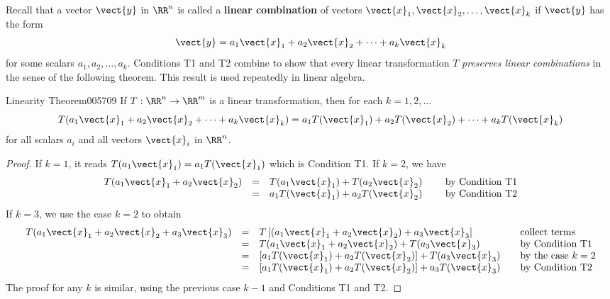 Recall that a vector $\vect{y}$ in $\RR^n$ is called a \textbf{linear combination} of vectors $\vect{x}_{1}, \vect{x}_{2}, \dots, \vect{x}_{k}$ if $\vect{y}$ has the form
\begin{equation*}
\vect{y} = a_{1}\vect{x}_{1} + a_{2}\vect{x}_{2} + \cdots + a_{k}\vect{x}_{k}
\end{equation*}
for some scalars $a_{1}, a_{2}, \dots, a_{k}$. Conditions T1 and T2 combine to show that every linear transformation $T$ \textit{preserves linear combinations} in the sense of the following theorem. This result is used repeatedly in linear algebra.

\begin{theorem}{Linearity Theorem}{005709}
If $T : \RR^n \to \RR^m$ is a linear transformation, then for each $k = 1, 2, \dots$
\begin{equation*}
T(a_{1}\vect{x}_{1} + a_{2}\vect{x}_{2} + \cdots + a_{k}\vect{x}_{k}) = a_{1}T(\vect{x}_{1}) + a_{2}T(\vect{x}_{2}) + \cdots + a_{k}T(\vect{x}_{k})
\end{equation*}
for all scalars $a_{i}$ and all vectors $\vect{x}_{i}$ in $\RR^n$.
\end{theorem}

\begin{proof}
If $k = 1$, it reads $T(a_{1}\vect{x}_{1}) = a_{1}T(\vect{x}_{1})$ which is Condition T1. If $k = 2$, we have
\begin{equation*}
\begin{array}{llllr}
T(a_{1}\vect{x}_{1} + a_{2}\vect{x}_{2}) & = & T(a_{1}\vect{x}_{1}) + T(a_{2}\vect{x}_{2}) & & \mbox{ by Condition T1} \\
& = & a_{1}T(\vect{x}_{1}) + a_{2}T(\vect{x}_{2})  & &  \mbox{by Condition T2}
\end{array}
\end{equation*}
If $k = 3$, we use the case $k = 2$ to obtain
\begin{equation*}
\begin{array}{lllll}
T(a_{1}\vect{x}_{1} + a_{2}\vect{x}_{2} + a_{3}\vect{x}_{3}) & = & T \left[(a_{1}\vect{x}_{1} + a_{2}\vect{x}_{2}) + a_{3}\vect{x}_{3} \right] & & \mbox{collect terms} \\
& = & T(a_{1}\vect{x}_{1} + a_{2}\vect{x}_{2}) + T(a_{3}\vect{x}_{3}) & & \mbox{by Condition T1} \\
& = & \left[a_{1}T(\vect{x}_{1}) + a_{2}T(\vect{x}_{2})\right] + T(a_{3}\vect{x}_{3}) & & \mbox{by the case } k = 2 \\
& = & \left[a_{1}T(\vect{x}_{1}) + a_{2}T(\vect{x}_{2})\right] + a_{3}T(\vect{x}_{3}) & & \mbox{by Condition T2}
\end{array}
\end{equation*}
The proof for any $k$ is similar, using the previous case $k - 1$ and Conditions T1 and T2.
\end{proof}

